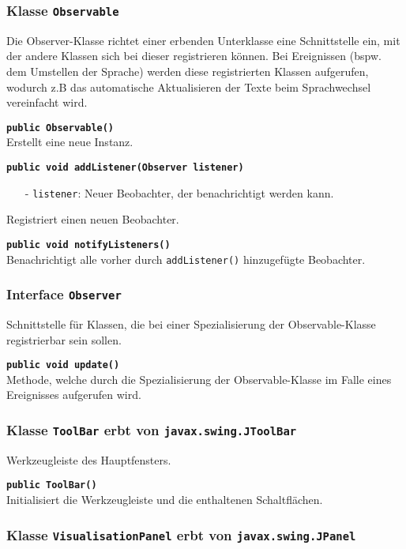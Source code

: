\documentclass[parskip=full,11pt,twoside]{scrartcl}
\begin{document}
\subsubsection{Klasse \texttt{Observable}}

Die Observer-Klasse richtet einer erbenden Unterklasse eine Schnittstelle ein, mit der andere Klassen sich bei dieser registrieren können. Bei Ereignissen (bspw. dem Umstellen der Sprache) werden diese registrierten Klassen aufgerufen, wodurch z.B das automatische Aktualisieren der Texte beim Sprachwechsel vereinfacht wird.

\textbf{\texttt{public Observable()}}\\
Erstellt eine neue Instanz.

\textbf{\texttt{public void addListener(Observer listener)}}
\begin{itemize}[noitemsep]
	\item[-] \texttt{listener}: Neuer Beobachter, der benachrichtigt werden kann.
\end{itemize}
Registriert einen neuen Beobachter.

\textbf{\texttt{public void notifyListeners()}}\\
Benachrichtigt alle vorher durch \texttt{addListener()} hinzugefügte Beobachter.

\subsubsection{Interface \texttt{Observer}}

Schnittstelle für Klassen, die bei einer Spezialisierung der Observable-Klasse registrierbar sein sollen.

\textbf{\texttt{public void update()}}\\
Methode, welche durch die Spezialisierung der Observable-Klasse im Falle eines Ereignisses aufgerufen wird.

\subsubsection{Klasse \texttt{ToolBar} erbt von \texttt{javax.swing.JToolBar}}

Werkzeugleiste des Hauptfensters.

\textbf{\texttt{public ToolBar()}}\\
Initialisiert die Werkzeugleiste und die enthaltenen Schaltflächen.

\subsubsection{Klasse \texttt{VisualisationPanel} erbt von \texttt{javax.swing.JPanel}}
\end{document}
